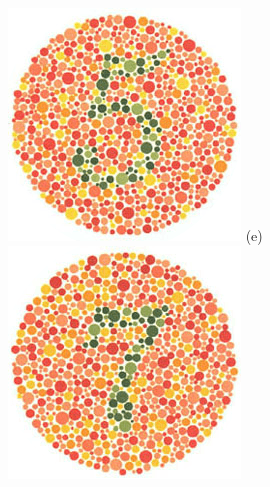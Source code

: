 \documentclass[	12pt, Times, openright, twoside, a4paper, english, brazil]{abntex2}
\begin{document}
\begin{apendicesenv}
\begin{figure}[!htb]
\centering
{\includegraphics[width=\linewidth]{ishihara-fuga/plate14.png}}
(e)
\endminipage\hfill
{}
\centering
{\includegraphics[width=\linewidth]{ishihara-fuga/plate15.png}}

\end{figure}
\end{apendicesenv}
\end{document}
